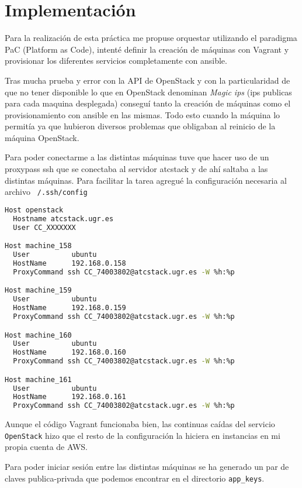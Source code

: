\chapter{Implementación}

Para la realización de esta práctica me propuse orquestar utilizando el paradigma PaC (Platform as Code), intenté definir la creación de máquinas con Vagrant y provisionar los diferentes servicios completamente con ansible.

\bigskip
Tras mucha prueba y error con la API de OpenStack y con la particularidad de que no tener disponible lo que en OpenStack denominan \textit{Magic ips} (ips publicas para cada maquina desplegada) conseguí tanto la creación de máquinas como el provisionamiento con ansible en las mismas. Todo esto cuando la máquina lo permitía ya que hubieron diversos problemas que obligaban al reinicio de la máquina OpenStack.

\bigskip
Para poder conectarme a las distintas máquinas tuve que hacer uso de un proxypass ssh que se conectaba al servidor atcstack y de ahí saltaba a las distintas máquinas. Para facilitar la tarea agregué la configuración necesaria al archivo \texttt{~/.ssh/config}

\begin{lstlisting}[language=bash,caption={fichero ~/.ssh/config}]
Host openstack
  Hostname atcstack.ugr.es
  User CC_XXXXXXX

Host machine_158
  User          ubuntu
  HostName      192.168.0.158
  ProxyCommand ssh CC_74003802@atcstack.ugr.es -W %h:%p

Host machine_159
  User          ubuntu
  HostName      192.168.0.159
  ProxyCommand ssh CC_74003802@atcstack.ugr.es -W %h:%p

Host machine_160
  User          ubuntu
  HostName      192.168.0.160
  ProxyCommand ssh CC_74003802@atcstack.ugr.es -W %h:%p

Host machine_161
  User          ubuntu
  HostName      192.168.0.161
  ProxyCommand ssh CC_74003802@atcstack.ugr.es -W %h:%p
\end{lstlisting}

Aunque el código Vagrant funcionaba bien, las continuas caídas del servicio \texttt{OpenStack} hizo que el resto de la configuración la hiciera en instancias en mi propia cuenta de AWS.

\bigskip
Para poder iniciar sesión entre las distintas máquinas se ha generado un par de claves publica-privada  que podemos encontrar en el directorio \texttt{app\_keys}.

